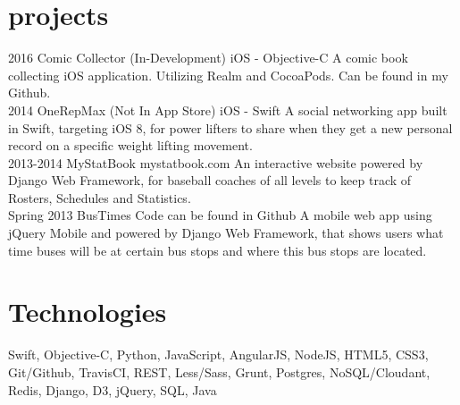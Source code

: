 \documentclass[]{friggeri-cv} %
\begin{document}

\section{projects}

\begin{entrylist}
\entry
{2016}
{Comic Collector (In-Development)}
{iOS - Objective-C}
{A comic book collecting iOS application. Utilizing Realm and CocoaPods. Can be found in my Github.}\\

\entry
{2014}
{OneRepMax (Not In App Store)}
{iOS - Swift}
{A social networking app built in Swift, targeting iOS 8, for power lifters to share when they get a new personal record on a specific weight lifting movement.}\\

\entry
{2013-2014}
{MyStatBook}
{mystatbook.com}
{An interactive website powered by Django Web Framework, for baseball coaches of all levels to keep track of Rosters, Schedules and Statistics.}\\

\entry
{Spring 2013}
{BusTimes}
{Code can be found in Github}
{A mobile web app using jQuery Mobile and powered by Django Web Framework, that shows users what time buses will be at certain bus stops and where this bus stops are located.}

\end{entrylist}


\section{Technologies}

Swift, Objective-C, Python, JavaScript, AngularJS, NodeJS, HTML5, CSS3, Git/Github, TravisCI, REST, Less/Sass, Grunt, Postgres, NoSQL/Cloudant, Redis, Django, D3, jQuery, SQL, Java
\end{document}
